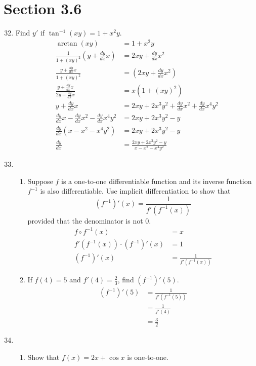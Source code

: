 \documentclass{article}
\begin{document}
\section{Section 3.6}

\begin{enumerate}
\setcounter{enumi}{31}
	\item Find $y'$ if $\tan^{-1}(xy)=1+x^2y$.
	$$\begin{align}
		\arctan(xy)&=1+x^2y\\
		\frac{1}{1+(xy)^2}(y+\frac{dy}{dx}x)&=2xy+\frac{dy}{dx}x^2\\
		\frac{y+\frac{dy}{dx}x }{1+(xy)^2}&=(2xy+\frac{dy}{dx}x^2)\\
		\frac{y+\frac{dy}{dx}x }{2y+\frac{dy}{dx}x }&= x(1+(xy)^2)\\
		y+\frac{dy}{dx}x&=2xy+2x^3y^2+\frac{dy}{dx}x^2+\frac{dy}{dx}x^4y^2\\
		\frac{dy}{dx}x-\frac{dy}{dx}x^2-\frac{dy}{dx}x^4y^2&=2xy+2x^3y^2-y\\
		\frac{dy}{dx}(x-x^2-x^4y^2)&=2xy+2x^3y^2-y\\
		\frac{dy}{dx}&=\frac{2xy+2x^3y^2-y}{x-x^2-x^4y^2}
	\end{align}$$
\setcounter{enumi}{40}
	\item
		\begin{enumerate}
			\item Suppose $f$ is a one-to-one differentiable function and its inverse function $f^{-1}$ is also differentiable. Use implicit differentiation to show that $$(f^{-1})'(x)=\frac{1}{f'(f^{-1}(x))}$$ provided that the denominator is not 0.
			$$\begin{align}
				f\circ f^{-1}(x)&=x\\
				f'(f^{-1}(x))\cdot (f^{-1})'(x) &= 1\\
				(f^{-1})'(x)&=\frac{1}{f'(f^{-1}(x))}
			\end{align}$$
			\item If $f(4)=5$ and $f'(4)=\frac{2}{3}$, find $(f^{-1})'(5)$.
			$$\begin{align}
				(f^{-1})'(5)&=\frac{1}{f'(f^{-1}(5))}\\
				&= \frac{1}{f'(4)}\\
				&= \frac{3}{2}
			\end{align}$$
		\end{enumerate}
	\item
		\begin{enumerate}
			\item Show that $f(x)=2x+\cos x$ is one-to-one.

\end{enumerate}
\end{enumerate}
\end{document}
